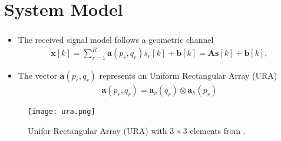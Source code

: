 \documentclass[10pt]{beamer}
\begin{document}
\section{System Model}
\begin{frame}[allowframebreaks]
    \frametitle{\insertsection}
    \begin{itemize}
        \item The received signal model follows a geometric channel
            \begin{align}
                \boldsymbol{x}[k] = \sum^{R}_{r = 1} \boldsymbol{a}(p_{r},q_{r}) s_{r}[k] + \boldsymbol{b}[k] = \boldsymbol{A} \boldsymbol{s}[k] + \boldsymbol{b}[k],
            \end{align}
        \item The vector $\boldsymbol{a}(p_{r},q_{r})$ represents an Uniform Rectangular Array (URA)
            \begin{align}
                \boldsymbol{a}(p_{r},q_{r}) = \boldsymbol{a}_{v}(q_{r}) \otimes \boldsymbol{a}_{h}(p_{r})
            \end{align}
    \end{itemize}
    \begin{figure}
        \centering 
        \texttt{[image: ura.png]}
        \caption{Unifor Rectangular Array (URA) with $3 \times 3$ elements from \cite{ribeiroseparable}.}
        \label{fig:ura} 
    \end{figure}
\end{frame}

\end{document}
